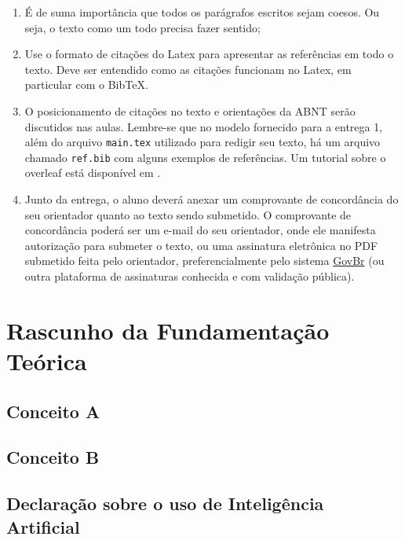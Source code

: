 \documentclass[
	12pt,				%
	openright,			%
	oneside,			%
	a4paper,			%
	chapter=TITLE,		%
	subsection=TITLE,	%
	english,			%
	brazil,				%
	]{abntex2}
\begin{document}
\begin{enumerate}
    \item É de suma importância que todos os parágrafos escritos sejam coesos. Ou seja, o texto como um todo precisa fazer sentido;
    \item Use o formato de citações do Latex para apresentar as referências em todo o texto. Deve ser entendido como as citações funcionam no Latex, em particular com o BibTeX. 
    \item O posicionamento de citações no texto e orientações da ABNT serão discutidos nas aulas. Lembre-se que no modelo fornecido para a entrega 1, além do arquivo \texttt{main.tex} utilizado para redigir seu texto, há um arquivo chamado \texttt{ref.bib} com alguns exemplos de referências. Um tutorial sobre o overleaf está disponível em \cite{TutorialOverleaf}. 
    \item Junto da entrega, o aluno deverá anexar um comprovante de concordância do seu orientador quanto ao texto sendo submetido. O comprovante de concordância poderá ser um e-mail do seu orientador, onde ele manifesta autorização para submeter o texto, ou uma assinatura eletrônica no PDF submetido feita pelo orientador, preferencialmente pelo sistema \href{https://www.gov.br/governodigital/pt-br/identidade/assinatura-eletronica}{GovBr} (ou outra plataforma de assinaturas conhecida e com validação pública).
\end{enumerate}

\chapter{Rascunho da Fundamentação Teórica}

\section{Conceito A}

\section{Conceito B}

\section{Declaração sobre o uso de Inteligência Artificial}


\end{document}
